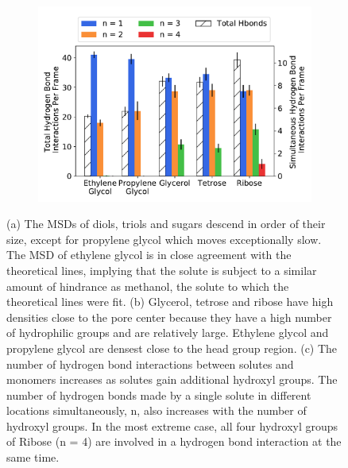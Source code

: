 \documentclass[journal=jpcbfk,manuscript=article]{achemso}
\begin{document}
\begin{figure}[!htb]
\begin{subfigure}{0.325\textwidth}
  \includegraphics[width=\linewidth]{multi_hbonds.pdf}
  \caption{}\label{fig:multi_hbonds}
  \end{subfigure}
  \caption{(a) The MSDs of diols, triols and sugars descend in order of their size, except
  for propylene glycol which moves exceptionally slow. The MSD of ethylene glycol 
  is in close agreement with the theoretical lines, implying that the solute 
  is subject to a similar amount of hindrance as methanol, the solute to which the
  theoretical lines were fit. (b) Glycerol, tetrose and ribose have high densities 
  close to the pore center because they have a high number of hydrophilic groups and
  are relatively large. Ethylene glycol and propylene glycol are densest close to the
  head group region. (c) The number of hydrogen bond interactions between solutes and
  monomers increases as solutes gain additional hydroxyl groups. The number of 
  hydrogen bonds made by a single solute in different locations simultaneously, n, 
  also increases with the number of hydroxyl groups. In the most extreme case, all 
  four hydroxyl groups of Ribose (n = 4) are involved in a hydrogen bond interaction
  at the same time.}\label{fig:polyols}
  \end{figure}
  
\end{document}
